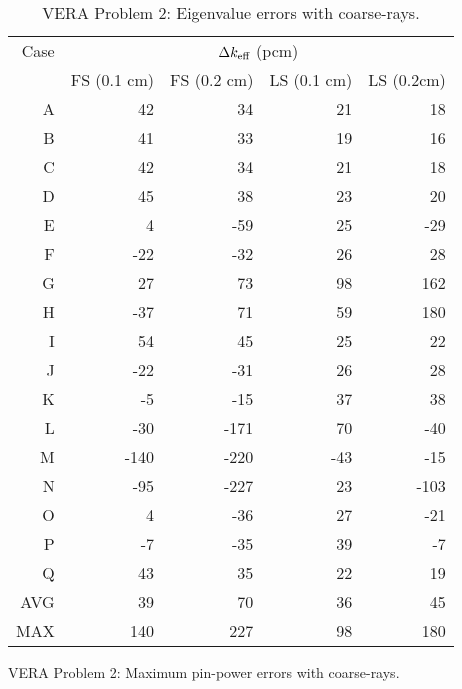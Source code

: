 {{{{        \begin{table}[htbp]
          \centering
          \caption{VERA Problem 2: Eigenvalue errors with coarse-rays.\label{tab:LSMOC:Lattice:CR:Eigenvalue}}
          \small
          \begin{tabular}{rrrrr} \toprule
            Case  & \multicolumn{4}{c}{$\Delta k_{\text{eff}}$ (pcm)}\\\cline{2-5}
                  & FS (0.1 cm) & FS (0.2 cm) & LS (0.1 cm) & LS (0.2cm)\\\midrule
            A     & 42   &   34    &  21   &   18  \\
            B     & 41   &   33    &  19   &   16  \\
            C     & 42   &   34    &  21   &   18  \\
            D     & 45   &   38    &  23   &   20  \\
            E     & 4    &   -59   &  25   &   -29 \\
            F     & -22  &   -32   &  26   &   28  \\
            G     & 27   &   73    &  98   &   162 \\
            H     & -37  &   71    &  59   &   180 \\
            I     & 54   &   45    &  25   &   22  \\
            J     & -22  &   -31   &  26   &   28  \\
            K     & -5   &   -15   &  37   &   38  \\
            L     & -30  &   -171  &  70   &   -40 \\
            M     & -140 &   -220  &  -43  &   -15 \\
            N     & -95  &   -227  &  23   &   -103\\
            O     & 4    &   -36   &  27   &   -21 \\
            P     & -7   &   -35   &  39   &   -7  \\
            Q     & 43   &   35    &  22   &   19  \\\midrule
            AVG   & 39   &   70    &  36   &   45  \\
            MAX   & 140  &   227   &  98   &   180 \\\bottomrule
          \end{tabular}
        \end{table}
        \begin{table}[htbp]
          \centering
          \caption{VERA Problem 2: Maximum pin-power errors with coarse-rays.\label{tab:LSMOC:Lattice:CR:PinPower}}

\end{table}}}}}

